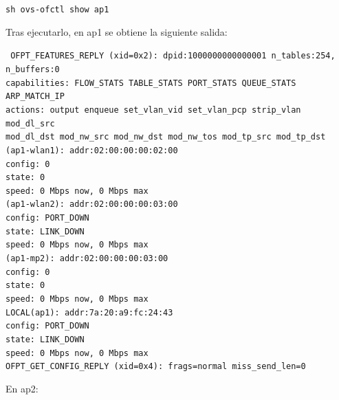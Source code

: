 \documentclass[a4paper,12pt,twoside,spanish]{book}
\begin{document}
\begin{center}
	\texttt{sh ovs-ofctl show ap1}
\end{center}

Tras ejecutarlo, en ap1 se obtiene la siguiente salida:

\noindent\texttt{
\indent OFPT\_FEATURES\_REPLY (xid=0x2): dpid:1000000000000001 n\_tables:254,    \\ 
\indent \indent n\_buffers:0\\
\indent capabilities: FLOW\_STATS TABLE\_STATS PORT\_STATS QUEUE\_STATS \\ 
\indent \indent ARP\_MATCH\_IP\\
\indent actions: output enqueue set\_vlan\_vid set\_vlan\_pcp strip\_vlan mod\_dl\_src\\ 
\indent \indent mod\_dl\_dst mod\_nw\_src mod\_nw\_dst mod\_nw\_tos mod\_tp\_src mod\_tp\_dst\\
(ap1-wlan1): addr:02:00:00:00:02:00\\
\indent \indent config:     0\\
\indent \indent state:      0\\
\indent \indent speed: 0 Mbps now, 0 Mbps max\\
(ap1-wlan2): addr:02:00:00:00:03:00\\
\indent \indent config:     PORT\_DOWN\\
\indent \indent state:      LINK\_DOWN\\
\indent \indent speed: 0 Mbps now, 0 Mbps max\\
(ap1-mp2): addr:02:00:00:00:03:00\\
\indent \indent config:     0\\
\indent \indent state:      0\\
\indent \indent speed: 0 Mbps now, 0 Mbps max\\
\indent LOCAL(ap1): addr:7a:20:a9:fc:24:43\\
\indent \indent config:     PORT\_DOWN\\
\indent \indent state:      LINK\_DOWN\\
\indent \indent speed: 0 Mbps now, 0 Mbps max\\
\indent OFPT\_GET\_CONFIG\_REPLY (xid=0x4): frags=normal miss\_send\_len=0\\
}\par

En ap2:\par
\end{document}
